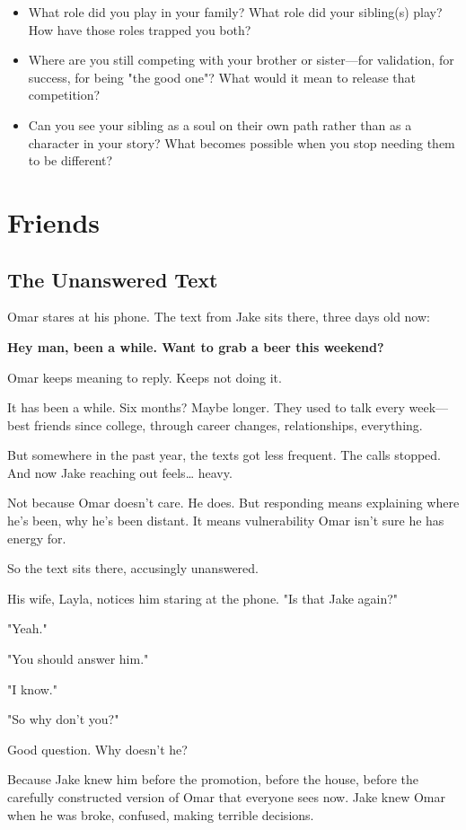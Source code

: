 \documentclass[11pt,twoside]{book}
\begin{document}
\begin{itemize}
\item What role did you play in your family? What role did your sibling(s) play? How have those roles trapped you both?
\item Where are you still competing with your brother or sister—for validation, for success, for being "the good one"? What would it mean to release that competition?
\item Can you see your sibling as a soul on their own path rather than as a character in your story? What becomes possible when you stop needing them to be different?
\end{itemize}

\chapter{Friends}

\section*{The Unanswered Text}

Omar stares at his phone. The text from Jake sits there, three days old now:

\textbf{Hey man, been a while. Want to grab a beer this weekend?}

Omar keeps meaning to reply. Keeps not doing it.

It has been a while. Six months? Maybe longer. They used to talk every week—best friends since college, through career changes, relationships, everything.

But somewhere in the past year, the texts got less frequent. The calls stopped. And now Jake reaching out feels\ldots{} heavy.

Not because Omar doesn't care. He does. But responding means explaining where he's been, why he's been distant. It means vulnerability Omar isn't sure he has energy for.

So the text sits there, accusingly unanswered.

His wife, Layla, notices him staring at the phone. "Is that Jake again?"

"Yeah."

"You should answer him."

"I know."

"So why don't you?"

Good question. Why doesn't he?

Because Jake knew him before the promotion, before the house, before the carefully constructed version of Omar that everyone sees now. Jake knew Omar when he was broke, confused, making terrible decisions.
\end{document}
